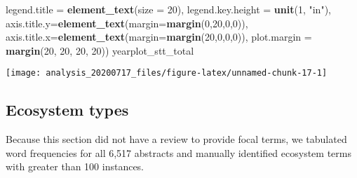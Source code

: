 \documentclass[
]{article}
\newenvironment{Shaded}{\begin{snugshade}}{\end{snugshade}}
\newcommand{\DataTypeTok}[1]{\textcolor[rgb]{0.13,0.29,0.53}{#1}}
\newcommand{\DecValTok}[1]{\textcolor[rgb]{0.00,0.00,0.81}{#1}}
\newcommand{\KeywordTok}[1]{\textcolor[rgb]{0.13,0.29,0.53}{\textbf{#1}}}
\newcommand{\NormalTok}[1]{#1}
\newcommand{\StringTok}[1]{\textcolor[rgb]{0.31,0.60,0.02}{#1}}
\begin{document}
\begin{Shaded}
\begin{Highlighting}[]
        \DataTypeTok{legend.title =} \KeywordTok{element_text}\NormalTok{(}\DataTypeTok{size =} \DecValTok{20}\NormalTok{),}
        \DataTypeTok{legend.key.height =} \KeywordTok{unit}\NormalTok{(}\DecValTok{1}\NormalTok{, }\StringTok{"in"}\NormalTok{),}
        \DataTypeTok{axis.title.y=}\KeywordTok{element_text}\NormalTok{(}\DataTypeTok{margin=}\KeywordTok{margin}\NormalTok{(}\DecValTok{0}\NormalTok{,}\DecValTok{20}\NormalTok{,}\DecValTok{0}\NormalTok{,}\DecValTok{0}\NormalTok{)), }
        \DataTypeTok{axis.title.x=}\KeywordTok{element_text}\NormalTok{(}\DataTypeTok{margin=}\KeywordTok{margin}\NormalTok{(}\DecValTok{20}\NormalTok{,}\DecValTok{0}\NormalTok{,}\DecValTok{0}\NormalTok{,}\DecValTok{0}\NormalTok{)),}
        \DataTypeTok{plot.margin =} \KeywordTok{margin}\NormalTok{(}\DecValTok{20}\NormalTok{, }\DecValTok{20}\NormalTok{, }\DecValTok{20}\NormalTok{, }\DecValTok{20}\NormalTok{))}
\NormalTok{yearplot_stt_total}
\end{Highlighting}
\end{Shaded}

\begin{center}\texttt{[image: analysis\_20200717\_files/figure-latex/unnamed-chunk-17-1]} \end{center}

\hypertarget{ecosystem-types}{%
\subsection{Ecosystem types}\label{ecosystem-types}}

Because this section did not have a review to provide focal terms, we
tabulated word frequencies for all 6,517 abstracts and manually
identified ecosystem terms with greater than 100 instances.
\end{document}
